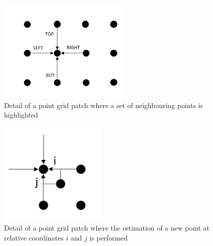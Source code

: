 \begin{figure}[t]
	\begin{center}
		\includegraphics[width=.8\textwidth, height=5cm, keepaspectratio]{images/grid-subwindow-detail}
\caption{Detail of a point grid patch where a set of neighbouring points is highlighted}
\label{fig:grid-subpatch}
	\end{center}
\end{figure}

\begin{figure}[t]
	\begin{center}
		\includegraphics[width=.8\textwidth, height=5cm, keepaspectratio]{images/point-estimation-detail}
\caption{Detail of a point grid patch where the estimation of a new point at relative coordinates $i$ and $j$ is performed}
\label{fig:subpatch-estimation}
	\end{center}
\end{figure}

